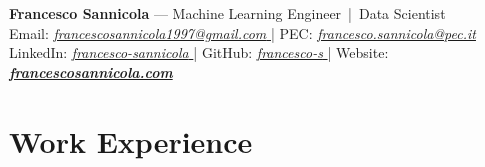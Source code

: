 \documentclass[11pt,a4paper]{article}
\let\OldHref\href
\renewcommand{\href}[2]{\OldHref{#1}{\textit{#2}}}
\begin{document}
	
	\begin{center}
		{\Large \textbf{Francesco Sannicola} — Machine Learning Engineer \,|\, Data Scientist}\\
		Email: \href{mailto:francescosannicola1997@gmail.com}{francescosannicola1997@gmail.com } |
		PEC: \href{mailto:francesco.sannicola@pec.it}{francesco.sannicola@pec.it } \\
		LinkedIn: \href{https://www.linkedin.com/in/francesco-sannicola}{francesco-sannicola } | 
		GitHub: \href{https://github.com/francesco-s}{francesco-s } | 
		Website: \href{https://francescosannicola.com}{\textbf{francescosannicola.com }}
	\end{center}
	
	\vspace{6pt} %
	
	\section*{Work Experience}
	
\end{document}
